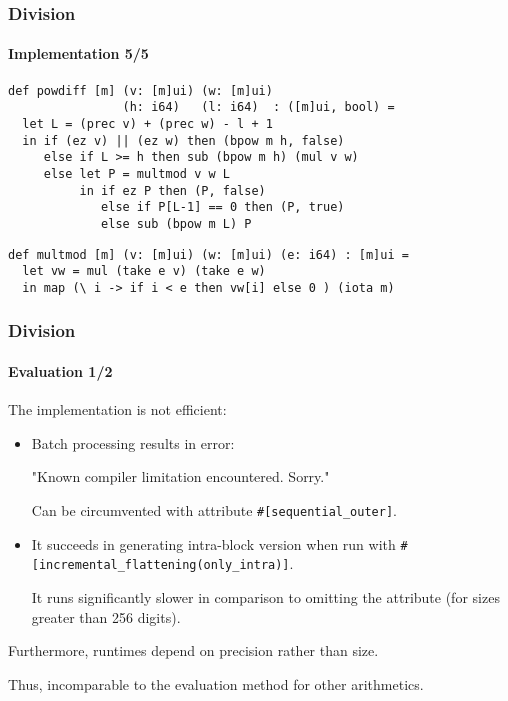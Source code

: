 \begin{frame}[fragile]
  \frametitle{Division}
  \framesubtitle{Implementation 5/5}
\begin{lstlisting}[language=futhark,basicstyle=\scriptsize,escapeinside=@@,firstnumber=49,frame=single]
def powdiff [m] (v: [m]ui) (w: [m]ui)
                (h: i64)   (l: i64)  : ([m]ui, bool) =
  let L = (prec v) + (prec w) - l + 1
  in if (ez v) || (ez w) then (bpow m h, false)
     else if L >= h then sub (bpow m h) (mul v w)
     else let P = multmod v w L
          in if ez P then (P, false)
             else if P[L-1] == 0 then (P, true)
             else sub (bpow m L) P
\end{lstlisting}\vspace*{0.5em}

\begin{lstlisting}[language=futhark,basicstyle=\scriptsize,escapeinside=@@,firstnumber=58,frame=single]
def multmod [m] (v: [m]ui) (w: [m]ui) (e: i64) : [m]ui =
  let vw = mul (take e v) (take e w)
  in map (\ i -> if i < e then vw[i] else 0 ) (iota m)
\end{lstlisting}
\end{frame}

\begin{frame}[fragile]
  \frametitle{Division}
  \framesubtitle{Evaluation 1/2}
  The implementation is not efficient:
  \begin{itemize}\footnotesize
  \item Batch processing results in error:

    "Known compiler limitation encountered. Sorry."

    Can be circumvented with attribute \texttt{\#[sequential\_outer]}.\pause

  \item It succeeds in generating intra-block version when run with
    \texttt{\#[incremental\_flattening(only\_intra)]}.

    It runs significantly slower in comparison to omitting the attribute (for
    sizes greater than 256 digits).
  \end{itemize}\vspace*{0.5em}\pause

  Furthermore, runtimes depend on precision rather than size.

  Thus, incomparable to the evaluation method for other arithmetics.
\end{frame}

